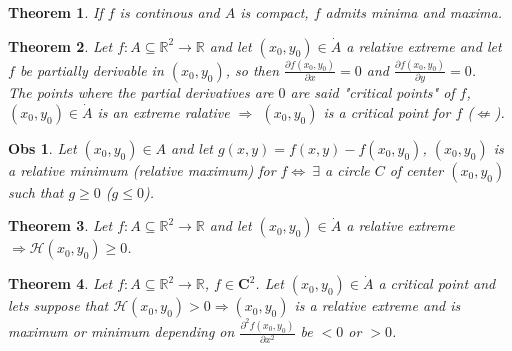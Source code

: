 \documentclass{article}
\newtheorem{theorem}{Theorem}
\newtheorem{observation}{Obs}
\begin{document}
        \begin{theorem}
            If $f$ is continous and $A$ is compact, $f$ admits minima and maxima.
        \end{theorem}
        \begin{theorem}
            Let $f : A \subseteq \mathbb{R}^2 \rightarrow \mathbb{R}$ and let $(x_0,y_0) \in \dot{A}$ a relative extreme and let  $f$ be partially derivable in $(x_0,y_0)$, so then $\frac{\partial f(x_0,y_0)}{\partial x} = 0$ and $\frac{\partial f(x_0,y_0)}{\partial y} = 0$. \\
            The points where the partial derivatives are $0$ are said "critical points" of $f$, $(x_0,y_0) \in \dot{A}$ is an extreme ralative $\Rightarrow$ $(x_0,y_0)$ is a critical point for $f$ ($\nLeftarrow$).         
        \end{theorem}
        \begin{observation}
            Let $(x_0,y_0) \in A$ and let $g(x,y) = f(x,y) - f(x_0,y_0)$, $(x_0,y_0)$ is a relative minimum (relative maximum) for $f \Longleftrightarrow \ \exists$ a circle $C$ of center $(x_0,y_0)$ such that $g \geq 0$ ($g \leq 0$).
        \end{observation}
        \begin{theorem}
            Let $f : A \subseteq \mathbb{R}^2 \rightarrow \mathbb{R}$ and let $(x_0,y_0) \in \dot{A}$ a relative extreme $\Longrightarrow \mathcal{H}(x_0,y_0) \geqslant 0$.
        \end{theorem}
        \begin{theorem}
            Let $f : A \subseteq \mathbb{R}^2 \rightarrow \mathbb{R}$, $f \in \mathbf{C}^2$. Let $(x_0,y_0) \in \dot{A}$ a critical point and lets suppose that $\mathcal{H}(x_0,y_0) > 0 \Longrightarrow (x_0,y_0)$ is a relative extreme and is maximum or minimum depending on $\frac{\partial^2 f(x_0,y_0)}{\partial x^2}$ be $<0$ or $>0$.  
        \end{theorem}
\end{document}
